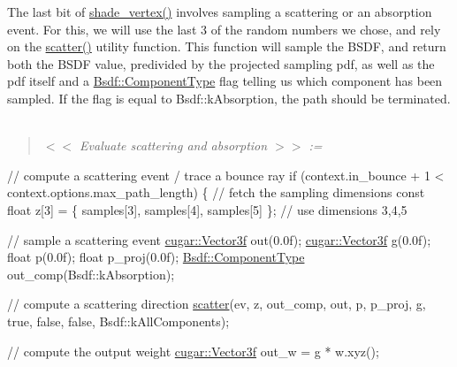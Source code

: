 \begin{DoxyParagraph}{}
The last bit of \hyperlink{_hello_renderer_page_shade_vertex_anchor}{shade\+\_\+vertex()} involves sampling a scattering or an absorption event. For this, we will use the last 3 of the random numbers we chose, and rely on the \hyperlink{group___b_p_t_lib_core_ga161551b8c343e47e329703e71e0aaeca}{scatter()} utility function. This function will sample the B\+S\+DF, and return both the B\+S\+DF value, predivided by the projected sampling pdf, as well as the pdf itself and a \hyperlink{struct_bsdf_a5f7db6f81220ed9ee6da109d6eb5b585}{Bsdf\+::\+Component\+Type} flag telling us which component has been sampled. If the flag is equal to Bsdf\+::k\+Absorption, the path should be terminated. ~\newline
\label{_hello_renderer_page_Evaluate_scattering_and_absorption_anchor}%
%
 \begin{quote}
{\itshape  $<$$<$ Evaluate scattering and absorption $>$$>$ \+:= }

\end{quote}

\begin{DoxyCodeInclude}
        \textcolor{comment}{// compute a scattering event / trace a bounce ray}
        \textcolor{keywordflow}{if} (context.in\_bounce + 1 < context.options.max\_path\_length)
        \{
            \textcolor{comment}{// fetch the sampling dimensions}
            \textcolor{keyword}{const} \textcolor{keywordtype}{float} z[3] = \{ samples[3], samples[4], samples[5] \}; \textcolor{comment}{// use dimensions 3,4,5}

            \textcolor{comment}{// sample a scattering event}
            \hyperlink{structcugar_1_1_vector}{cugar::Vector3f}      out(0.0f);
            \hyperlink{structcugar_1_1_vector}{cugar::Vector3f}      g(0.0f);
            \textcolor{keywordtype}{float}               p(0.0f);
            \textcolor{keywordtype}{float}               p\_proj(0.0f);
            \hyperlink{struct_bsdf_a5f7db6f81220ed9ee6da109d6eb5b585}{Bsdf::ComponentType} out\_comp(Bsdf::kAbsorption);

            \textcolor{comment}{// compute a scattering direction}
            \hyperlink{group___b_p_t_lib_core_ga161551b8c343e47e329703e71e0aaeca}{scatter}(ev, z, out\_comp, out, p, p\_proj, g, \textcolor{keyword}{true}, \textcolor{keyword}{false}, \textcolor{keyword}{false}, Bsdf::kAllComponents);

            \textcolor{comment}{// compute the output weight}
            \hyperlink{structcugar_1_1_vector}{cugar::Vector3f}  out\_w = g * w.xyz();


\end{DoxyCodeInclude}
\end{DoxyParagraph}
